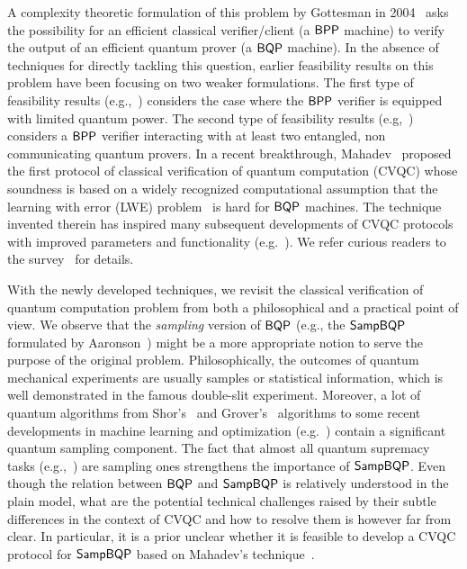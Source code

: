 A complexity theoretic formulation of this problem by Gottesman in 2004~\cite{web:Aaronson} asks the possibility for an efficient classical verifier/client (a $\operatorname{\mathsf{BPP}}$ machine) to verify the output of an
efficient quantum prover (a $\operatorname{\mathsf{BQP}}$ machine).
In the absence of techniques for directly tackling this question, earlier feasibility results on this problem have been focusing on two weaker formulations. 
The first type of feasibility results (e.g.,~\cite{BFK09,arXiv:ABOEM17,PR:FitKas17,mf16}) considers the case where the $\operatorname{\mathsf{BPP}}$ verifier is equipped with limited quantum power.
The second type of feasibility results (e.g,~\cite{Nat:RUV13, CGJV19, Gheorghiu_2015, HPF15})
considers a $\operatorname{\mathsf{BPP}}$ verifier interacting with at least two entangled, non communicating quantum provers. 
In a recent breakthrough, Mahadev~\cite{FOCS:Mahadev18a} proposed the first protocol of classical verification of quantum computation (CVQC) whose soundness is based on a widely recognized computational assumption that the learning with error (LWE) problem~\cite{JACM:Regev09} is hard for $\operatorname{\mathsf{BQP}}$ machines. 
The technique invented therein has inspired many  subsequent developments of CVQC protocols with improved parameters and functionality (e.g.~\cite{FOCS:GheVid19,arXiv:AlaChiHun19,arXiv:ChiaChungYam19}). 
We refer curious readers to the survey~\cite{survey:GKK19} for details. 

With the newly developed techniques, we revisit the classical verification of quantum computation problem from both a philosophical and a practical point of view. 
We observe that the \emph{sampling} version of $\operatorname{\mathsf{BQP}}$ (e.g., the $\operatorname{\mathsf{SampBQP}}$ formulated by Aaronson~\cite{aaronson_2013}) might be a more appropriate notion to serve the purpose of the original problem. 
Philosophically, the outcomes of quantum mechanical experiments are usually samples or statistical information, which is well demonstrated in the famous double-slit experiment. 
Moreover, a lot of quantum algorithms from Shor's~\cite{Shor} and Grover's~\cite{Grover} algorithms to some recent developments in machine learning and optimization (e.g.~\cite{brando_et_al:LIPIcs:2019:10603, AGGW17,pmlr-v97-li19b}) contain a significant quantum sampling component. 
The fact that almost all quantum supremacy tasks (e.g.,~\cite{Boson, IQP, nature-google}) are sampling ones strengthens the importance of $\operatorname{\mathsf{SampBQP}}$. 
Even though the relation between $\operatorname{\mathsf{BQP}}$ and $\operatorname{\mathsf{SampBQP}}$ is relatively understood in the plain model, what are the potential technical challenges raised by their subtle differences in the context of CVQC and how to resolve them is however far from clear. 
In particular, it is a prior unclear whether it is feasible to develop a CVQC protocol for $\operatorname{\mathsf{SampBQP}}$ based on Mahadev's technique~\cite{FOCS:Mahadev18a}.

